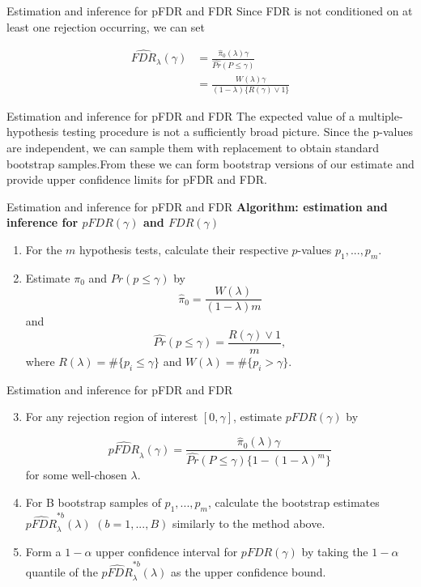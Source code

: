 \documentclass{beamer}
\begin{document}
\begin{frame}[t]{Estimation and inference for pFDR and FDR}\vspace{10pt}
Since FDR is not conditioned on at least one rejection occurring, we can set

\begin{align*}
\hat{FDR}_{\lambda}(\gamma) &= \frac{\hat\pi_0(\lambda)\gamma}{\hat{Pr}(P \leq \gamma)} \\
&= \frac{W(\lambda)\gamma}{(1-\lambda)\{R(\gamma)\vee 1\}} 
\end{align*}

\end{frame}

\begin{frame}[t]{Estimation and inference for pFDR and FDR}\vspace{10pt}
The expected value of a multiple-hypothesis testing procedure is not a sufficiently broad picture. Since the p-values are independent, we can sample them with replacement to obtain standard bootstrap samples.From these we can form bootstrap versions of our estimate and provide upper confidence limits for pFDR and FDR.

\end{frame}

\begin{frame}[t]{Estimation and inference for pFDR and FDR}\vspace{10pt}
\textbf{Algorithm: estimation and inference for $pFDR(\gamma)$ and $FDR(\gamma)$}
\begin{enumerate}
	\item For the $m$ hypothesis tests, calculate their respective $p$-values $p_1,...,p_m$.
	\item Estimate $\pi_0$ and $Pr(p\leq \gamma)$ by
	$$ \hat{\pi}_0 = \frac{W(\lambda)}{(1-\lambda)m} $$ and
	$$ \hat{Pr}(p\leq \gamma) = \frac{R(\gamma) \vee 1}{m}, $$
	where $R(\lambda)=\#\{p_i \leq \gamma\}$ and $W(\lambda)=\#\{p_i > \gamma\}$. 
\end{enumerate}
\end{frame}


\begin{frame}[t]{Estimation and inference for pFDR and FDR}\vspace{10pt}
\begin{enumerate}
	\setcounter{enumi}{2}
\item For any rejection region of interest $[0,\gamma]$, estimate $pFDR(\gamma)$ by

$$ \hat{pFDR}_\lambda(\gamma) = \frac{\hat{\pi}_0(\lambda)\gamma}{\hat{Pr}(P \leq \gamma) \{1-(1-\lambda)^m\}}$$
for some well-chosen $\lambda$.

\item For B bootstrap samples of $p_1,...,p_m$, calculate the bootstrap estimates $\hat{pFDR}_\lambda^{*b}(\lambda)$ $(b = 1,...,B)$ similarly to the method above.

\item Form a $1-\alpha$ upper confidence interval for $pFDR(\gamma)$ by taking the $1-\alpha$ quantile of the $\hat{pFDR}_\lambda^{*b}(\lambda)$ as the upper confidence bound.
\end{enumerate}
\end{frame}
\end{document}
